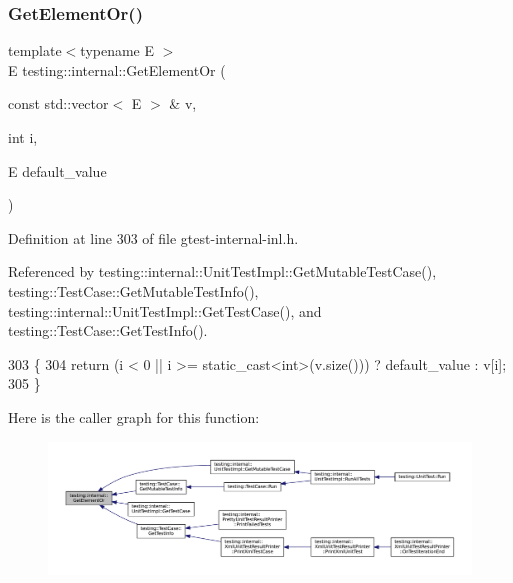 \subsubsection{\texorpdfstring{Get\+Element\+Or()}{GetElementOr()}}
{\footnotesize\ttfamily template$<$typename E $>$ \\
E testing\+::internal\+::\+Get\+Element\+Or (\begin{DoxyParamCaption}\item[{const std\+::vector$<$ E $>$ \&}]{v,  }\item[{int}]{i,  }\item[{E}]{default\+\_\+value }\end{DoxyParamCaption})\hspace{0.3cm}{\ttfamily [inline]}}



Definition at line 303 of file gtest-\/internal-\/inl.\+h.



Referenced by testing\+::internal\+::\+Unit\+Test\+Impl\+::\+Get\+Mutable\+Test\+Case(), testing\+::\+Test\+Case\+::\+Get\+Mutable\+Test\+Info(), testing\+::internal\+::\+Unit\+Test\+Impl\+::\+Get\+Test\+Case(), and testing\+::\+Test\+Case\+::\+Get\+Test\+Info().


\begin{DoxyCode}
303                                                                      \{
304   \textcolor{keywordflow}{return} (i < 0 || i >= static\_cast<int>(v.size())) ? default\_value : v[i];
305 \}
\end{DoxyCode}
Here is the caller graph for this function\+:
\nopagebreak
\begin{figure}[H]
\begin{center}
\leavevmode
\includegraphics[width=350pt]{namespacetesting_1_1internal_a71fdd20a0686bea3dc0cdcd95e0bca1c_icgraph}
\end{center}
\end{figure}
\mbox{\label{namespacetesting_1_1internal_aa261c22df383e9007129c92e36e30e62}} 

